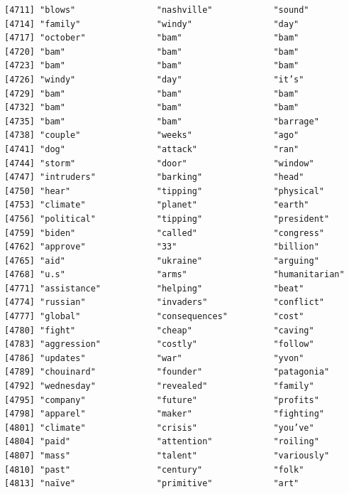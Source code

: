 \documentclass[
  letterpaper,
  DIV=11,
  numbers=noendperiod]{scrartcl}
\begin{document}
\begin{verbatim}
[4711] "blows"                "nashville"            "sound"               
[4714] "family"               "windy"                "day"                 
[4717] "october"              "bam"                  "bam"                 
[4720] "bam"                  "bam"                  "bam"                 
[4723] "bam"                  "bam"                  "bam"                 
[4726] "windy"                "day"                  "it’s"                
[4729] "bam"                  "bam"                  "bam"                 
[4732] "bam"                  "bam"                  "bam"                 
[4735] "bam"                  "bam"                  "barrage"             
[4738] "couple"               "weeks"                "ago"                 
[4741] "dog"                  "attack"               "ran"                 
[4744] "storm"                "door"                 "window"              
[4747] "intruders"            "barking"              "head"                
[4750] "hear"                 "tipping"              "physical"            
[4753] "climate"              "planet"               "earth"               
[4756] "political"            "tipping"              "president"           
[4759] "biden"                "called"               "congress"            
[4762] "approve"              "33"                   "billion"             
[4765] "aid"                  "ukraine"              "arguing"             
[4768] "u.s"                  "arms"                 "humanitarian"        
[4771] "assistance"           "helping"              "beat"                
[4774] "russian"              "invaders"             "conflict"            
[4777] "global"               "consequences"         "cost"                
[4780] "fight"                "cheap"                "caving"              
[4783] "aggression"           "costly"               "follow"              
[4786] "updates"              "war"                  "yvon"                
[4789] "chouinard"            "founder"              "patagonia"           
[4792] "wednesday"            "revealed"             "family"              
[4795] "company"              "future"               "profits"             
[4798] "apparel"              "maker"                "fighting"            
[4801] "climate"              "crisis"               "you’ve"              
[4804] "paid"                 "attention"            "roiling"             
[4807] "mass"                 "talent"               "variously"           
[4810] "past"                 "century"              "folk"                
[4813] "naïve"                "primitive"            "art"                 

\end{verbatim}
\end{document}

